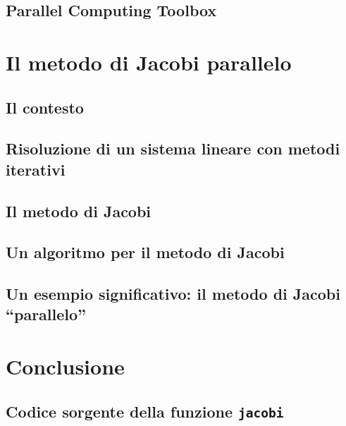 \documentclass[
	a4paper,
	twoside,
	12pt
]{book}
\begin{document}
\section{Parallel Computing Toolbox}
\label{par2.2}

\chapter{Il metodo di Jacobi parallelo}
\label{cap:metodoJacobiParallelo}

\section{Il contesto}
\label{par:contestoMetodoJacobi}

\section{Risoluzione di un sistema lineare con metodi iterativi}

\section{Il metodo di Jacobi}
\label{par:metodoJacobi}

\section{Un algoritmo per il metodo di Jacobi}
\label{par:algoritmoJacobi}

\section{Un esempio significativo: il metodo di Jacobi \enquote{parallelo}}
\label{par:applicazioneMetodoJacobi}

\nocite{MathWorksIterativeMethods}
\chapter*{Conclusione}
\label{cap:conclusione}

\begin{appendix}
\chapter[Codice sorgente della funzione jacobi]{Codice sorgente della funzione \texttt{jacobi}}
\label{app:codiceSorgenteJacobi}

\end{appendix}
\backmatter
\printbibliography[heading=bibintoc, title={Bibliografia}]
\end{document}
